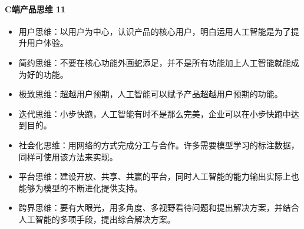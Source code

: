 \documentclass[letterpaper,11pt,english]{sphinxmanual}
\begin{document}
\paragraph{C端产品思维 11\sphinxfootnotemark[33]}
\label{\detokenize{chapter_introduction/2C:c-11}}%
\begin{footnotetext}[33]\sphinxAtStartFootnote
{}
%
\end{footnotetext}\ignorespaces \begin{itemize}
\item {} 
用户思维：以用户为中心，认识产品的核心用户，明白运用人工智能是为了提升用户体验。

\item {} 
简约思维：不要在核心功能外画蛇添足，并不是所有功能加上人工智能就能成为好的功能。

\item {} 
极致思维：超越用户预期，人工智能可以赋予产品超越用户预期的功能。

\item {} 
迭代思维：小步快跑，人工智能有时不是那么完美，企业可以在小步快跑中达到目的。

\item {} 
社会化思维：用网络的方式完成分工与合作。许多需要模型学习的标注数据，同样可使用该方法来实现。

\item {} 
平台思维：建设开放、共享、共赢的平台，同时人工智能的能力输出实际上也能够为模型的不断进化提供支持。

\item {} 
跨界思维：要有大眼光，用多角度、多视野看待问题和提出解决方案，并结合人工智能的多项手段，提出综合解决方案。

\end{itemize}
\end{document}
